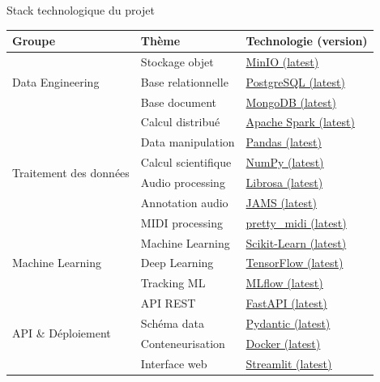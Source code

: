 \begin{frame}{Stack technologique du projet}
	\centering
	\begin{tabular}{|l|l|l|}
		\hline
		\textbf{Groupe} & \textbf{Thème} & \textbf{Technologie (version)} \\
		\hline
		
		\multirow{3}{*}{Data Engineering}
		& Stockage objet
		& \href{https://min.io/docs/}{MinIO (latest)} \\
		& Base relationnelle
		& \href{https://www.postgresql.org/docs/}{PostgreSQL (latest)} \\
		& Base document
		& \href{https://www.mongodb.com/docs/}{MongoDB (latest)} \\
		\hline
		
		\multirow{6}{*}{Traitement des données}
		& Calcul distribué
		& \href{https://spark.apache.org/docs/latest/}{Apache Spark (latest)} \\
		& Data manipulation
		& \href{https://pandas.pydata.org/docs/}{Pandas (latest)} \\
		& Calcul scientifique
		& \href{https://numpy.org/doc/}{NumPy (latest)} \\
		& Audio processing
		& \href{https://librosa.org/doc/latest/}{Librosa (latest)} \\
		& Annotation audio
		& \href{https://jams.readthedocs.io/}{JAMS (latest)} \\
		& MIDI processing
		& \href{https://craffel.github.io/pretty-midi/}{pretty\_midi (latest)} \\
		\hline
		
		\multirow{3}{*}{Machine Learning}
		& Machine Learning
		& \href{https://scikit-learn.org/stable/}{Scikit-Learn (latest)} \\
		& Deep Learning
		& \href{https://www.tensorflow.org/}{TensorFlow (latest)} \\
		& Tracking ML
		& \href{https://mlflow.org/docs/latest/}{MLflow (latest)} \\
		\hline
		
		\multirow{4}{*}{API \& Déploiement}
		& API REST
		& \href{https://fastapi.tiangolo.com/}{FastAPI (latest)} \\
		& Schéma data
		& \href{https://docs.pydantic.dev/}{Pydantic (latest)} \\
		& Conteneurisation
		& \href{https://docs.docker.com/}{Docker (latest)} \\
		& Interface web
		& \href{https://docs.streamlit.io/}{Streamlit (latest)} \\
		\hline
		
	\end{tabular}
\end{frame}